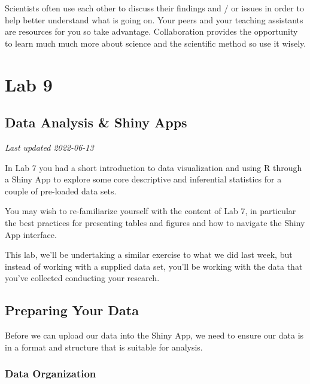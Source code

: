 \documentclass[
]{book}
\begin{document}
Scientists often use each other to discuss their findings and / or issues in order to help better understand what is going on. Your peers and your teaching assistants are resources for you so take advantage. Collaboration provides the opportunity to learn much much more about science and the scientific method so use it wisely.

\hypertarget{part-lab-9}{%
\part*{Lab 9}\label{part-lab-9}}

\hypertarget{data-analysis-shiny-apps}{%
\chapter*{Data Analysis \& Shiny Apps}\label{data-analysis-shiny-apps}}

\emph{Last updated 2022-06-13}

In Lab 7 you had a short introduction to data visualization and using R through a Shiny App to explore some core descriptive and inferential statistics for a couple of pre-loaded data sets.

You may wish to re-familiarize yourself with the content of Lab 7, in particular the best practices for presenting tables and figures and how to navigate the Shiny App interface.

This lab, we'll be undertaking a similar exercise to what we did last week, but instead of working with a supplied data set, you'll be working with the data that you've collected conducting your research.

\hypertarget{preparing-your-data}{%
\chapter*{Preparing Your Data}\label{preparing-your-data}}

Before we can upload our data into the Shiny App, we need to ensure our data is in a format and structure that is suitable for analysis.

\hypertarget{data-organization}{%
\section*{Data Organization}\label{data-organization}}
\end{document}
